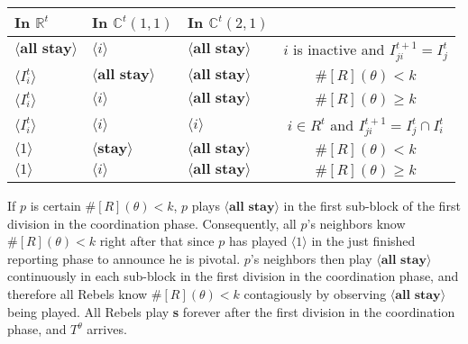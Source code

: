 \documentclass[12pt,letter]{article}
\newcommand{\Kappa}{\mathbb{C}}
\newcommand{\Omicron}{\mathbb{R}}
\theoremstyle{definition}
\theoremstyle{remark}
\theoremstyle{claim}
\begin{document}
\begin{table}[!htbp]
\begin{center}
\begin{tabular}{l l l | c}
\hline
\hline
In $\Omicron^t$			&	In $\Kappa^t(1,1)$			&			In $\Kappa^t(2,1)$		&   \\
\hline
$\langle \textbf{all stay} \rangle$  & $\langle i \rangle$	&  $\langle \textbf{all stay} \rangle$ &  $i$ is inactive and $I^{t+1}_{ji}=I^t_j$  \\
$\langle I^t_{i} \rangle$  & $\langle \textbf{all stay} \rangle$	&  $\langle \textbf{all stay} \rangle$ &  $\#[R](\theta)< k$ \\
$\langle I^t_{i} \rangle$  & $\langle i \rangle$	&  $\langle \textbf{all stay} \rangle$ &  $\#[R](\theta)\geq k$ \\
$\langle I^t_{i} \rangle$  & $\langle i \rangle$	&  $\langle i \rangle$ &  $i\in R^t$ and $I^{t+1}_{ji}=I^t_j\cap I^t_{i}$ \\
$\langle 1 \rangle$  & $\langle \textbf{stay} \rangle$	&	$\langle \textbf{all stay} \rangle$ &  $\#[R](\theta)< k$    \\
$\langle 1 \rangle$  & $\langle i \rangle$	&	$\langle \textbf{all stay} \rangle$ &  $\#[R](\theta)\geq k$  \\
  \hline
\end{tabular}
\end{center}
\end{table}


If $p$ is certain $\#[R](\theta)< k$, $p$ plays $\langle \textbf{all stay} \rangle$ in the first sub-block of the first division in the coordination phase. Consequently, all $p$'s neighbors know $\#[R](\theta)< k$ right after that since $p$ has played $\langle 1 \rangle$ in the just finished reporting phase to announce he is pivotal. $p$'s neighbors then play $\langle \textbf{all stay} \rangle$ continuously in each sub-block in the first division in the coordination phase, and therefore all Rebels know $\#[R](\theta)< k$ contagiously by observing $\langle \textbf{all stay} \rangle$ being played. All Rebels play \textbf{s} forever after the first division in the coordination phase, and $T^{\theta}$ arrives. 
\end{document}
